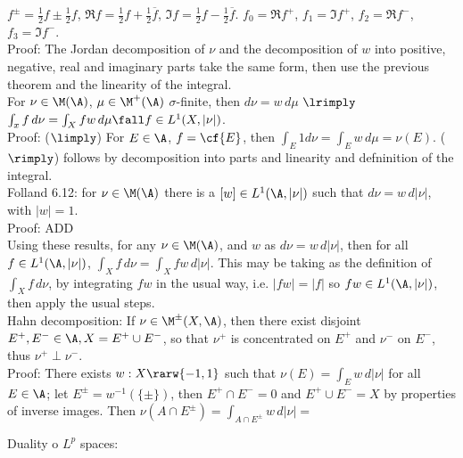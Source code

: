 \noindent
$f^\pm = \frac{1}{2} f \pm  \frac{1}{2} f$, $\Re{f} = \frac{1}{2} f + \frac{1}{2} \overline{f}$, $\Im{f} = \frac{1}{2} f - \frac{1}{2} \overline{f}$. $f_0 = \Re{f}^+$, $f_1 = \Im{f}^+$, $f_2 = \Re{f}^-$, $f_3 = \Im{f}^-$. \\

\noindent
Proof: The Jordan decomposition of $\nu$ and the decomposition of $w$ into positive, negative, real and imaginary parts take the same form, then use the  previous theorem and the linearity of the integral. \\

For $\nu \in \M(\A)$, $\mu \in \M^+(\A)$ $\sigma$-finite, then $d\nu = w \, d\mu$ $\lrimply$ $\int_x f \, d\nu = \int_X fw \, d\mu \fall f \in L^1(X, |\nu|)$.\\

\noindent
Proof: ($\limply$) For $E \in \A$, $f = \cf{E}$, then $\int_E 1 d\nu = \int_E w \, d\mu = \nu(E)$. ($\rimply$) follows by decomposition into parts and linearity and defninition of the integral.   \\

Folland 6.12: for $\nu \in \M(\A)$ there is a $[w] \in L^1(\A, |\nu|)$ such that $d\nu = w \, d|\nu|$, with $|w| = 1$. \\

\noindent
Proof: ADD \\

Using these results, for any $\nu \in \M(\A)$, and $w$ as $d\nu = w \, d|\nu|$, then for all $f \in L^1(\A, |\nu|)$, $\int_X f \, d\nu = \int_X f w \, d|\nu|$. This may be taking as the definition of $\int_X f \, d\nu$, by integrating $f w$ in the usual way, i.e. $|fw| = |f|$ so $fw \in L^1(\A, |\nu|)$, then apply the usual steps. \\


Hahn decomposition: If $\nu \in \M^\pm(X, \A)$, then there exist disjoint $E^+, E^- \in \A, X = E^+ \cup E^-$, so that $\nu^+$ is concentrated on $E^+$ and $\nu^-$ on $E^-$, thus $\nu^+ \perp \nu^-$. \\

Proof: There exists $w: X \rarw \{-1, 1 \}$ such that $\nu(E) = \int_E w \, d|\nu|$ for all $E \in \A$; let $E^\pm = w^{-1}(\{ \pm \})$, then $E^+ \cap E^- = 0$ and $E^+ \cup E^- = X$ by properties of inverse images. Then $\nu(A \cap E^\pm) = \int_{A \cap E^\pm} w \, d|\nu| = $




\break

Duality o $L^p$ spaces: \\

